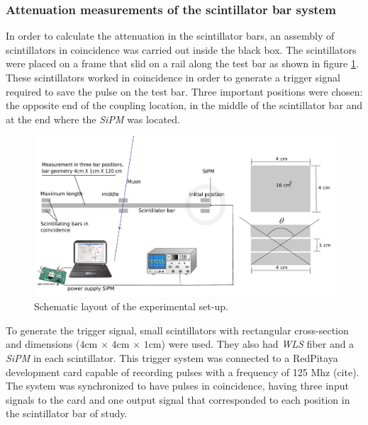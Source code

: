 \documentclass[submitting]{nst}
\begin{document}
\subsubsection{Attenuation measurements of the scintillator bar system}%

In order to calculate the attenuation in the scintillator bars, an assembly of scintillators in coincidence was carried out inside the black box. The scintillators were placed on a frame that slid on a rail along the test bar as shown in figure \ref{coincidencia_barras}. These scintillators worked in coincidence in order to generate a trigger signal required to save the pulse on the test bar. Three important positions were chosen: the opposite end of the coupling location, in the middle of the scintillator bar and at the end where the  \textsl{SiPM} was located.

\begin{figure}[h!] %
    \centering
        \includegraphics[scale=0.23]{Figures/barras_coincidencia.png}
   \caption{Schematic layout of the experimental set-up.} \label{coincidencia_barras}
\end{figure}

To generate the trigger signal, small scintillators with rectangular cross-section and dimensions ($4$cm $\times$ $4$cm $\times$ $1$cm) were used. They also had \textsl{WLS} fiber and a \textsl{SiPM} in each scintillator. This trigger system was connected to a RedPitaya development card capable of recording pulses with a frequency of 125 Mhz (cite). The system was synchronized to have pulses in coincidence, having three input signals to the card and one output signal that corresponded to each position in the scintillator bar of study.
\end{document}
